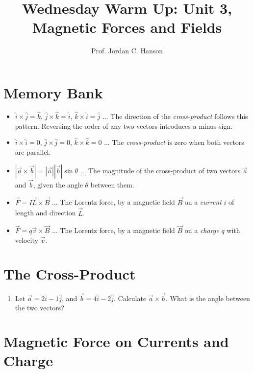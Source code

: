 \documentclass{article}
\begin{document}
\twocolumn

\title{Wednesday Warm Up: Unit 3, Magnetic Forces and Fields}
\author{Prof. Jordan C. Hanson}

\maketitle

\section{Memory Bank}

\begin{itemize}
\item $\hat{i} \times \hat{j} = \hat{k}$, $\hat{j} \times \hat{k} = \hat{i}$, $\hat{k} \times \hat{i} = \hat{j}$ ... The direction of the \textit{cross-product} follows this pattern.  Reversing the order of any two vectors introduces a minus sign.
\item $\hat{i} \times \hat{i} = 0$, $\hat{j} \times \hat{j} = 0$, $\hat{k} \times \hat{k} = 0$ ... The \textit{cross-product} is zero when both vectors are parallel.
\item $|\vec{a} \times \vec{b}| = |\vec{a}||\vec{b}|\sin\theta$ ... The magnitude of the cross-product of two vectors $\vec{a}$ and $\vec{b}$, given the angle $\theta$ between them.
\item $\vec{F} = I\vec{L} \times \vec{B}$ ... The Lorentz force, by a magnetic field $\vec{B}$ on a \textit{current} $i$ of length and direction $\vec{L}$.
\item $\vec{F} = q\vec{v} \times \vec{B}$ ... The Lorentz force, by a magnetic field $\vec{B}$ on a \textit{charge} $q$ with velocity $\vec{v}$.
\end{itemize}

\section{The Cross-Product}

\begin{enumerate}
\item Let $\vec{a} = 2\hat{i}-1\hat{j}$, and $\vec{b} = 4\hat{i}-2\hat{j}$.  Calculate $\vec{a} \times \vec{b}$.  What is the angle between the two vectors?  \\ \vspace{1cm}
\end{enumerate}

\section{Magnetic Force on Currents and Charge}
\end{document}
